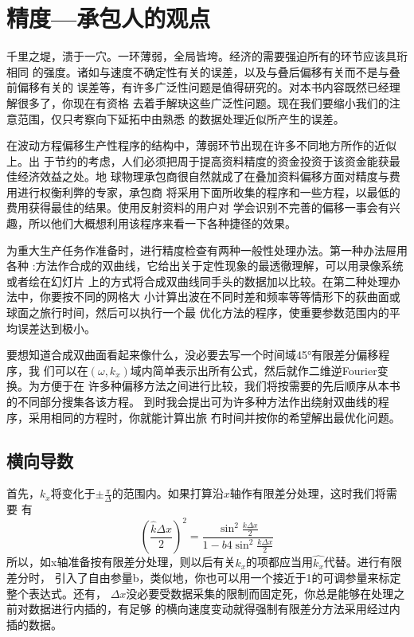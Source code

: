 \section{精度---承包人的观点}
\label{sec:4.7}

千里之堤，溃于一穴。一环薄弱，全局皆垮。经济的需要强迫所有的环节应该具珩相同
的强度。诸如与速度不确定性有关的误差，以及与叠后偏移有关而不是与叠前偏移有关的
误差等，有许多广泛性问题是值得研究的。对本书内容既然已经理解很多了，你现在有资格
去着手解玦这些广泛性问题。现在我们要缩小我们的注意范围，仅只考察向下延拓中由熟悉
的数据处理近似所产生的误差。

在波动方程偏移生产性程序的结构中，薄弱环节出现在许多不同地方所作的近似上。出
于节约的考虑，人们必须把周于提高资料精度的资金投资于该资金能获最佳经济效益之处。地
球物理承包商很自然就成了在叠加资料偏移方面对精度与费用进行权衡利弊的专家，承包商
将采用下面所收集的程序和一些方程，以最低的费用获得最佳的结果。使用反射资料的用户对
学会识别不完善的偏移一事会有兴趣，所以他们大概想利用该程序来看一下各种捷径的效果。

为重大生产任务作准备时，进行精度检查有两种一般性处理办法。第一种办法屉用各种
:方法作合成的双曲线，它给出关于定性现象的最透徹理解，可以用录像系统或者绘在幻灯片
上的方式将合成双曲线同手头的数据加以比较。在第二种处理办法中，你要按不同的网格大
小计算出波在不同时差和频率等等情形下的荻曲面或球面之旅行时间，然后可以执行一个最
优化方法的程序，使重要参数范围内的平均误差达到极小。

要想知道合成双曲面看起来像什么，没必要去写一个时间域45°有限差分偏移程序，我
们可以在$(\omega,k_x)$域内简单表示出所有公式，然后就作二维逆Fourier变换。为方便于在
许多种偏移方法之间进行比较，我们将按需要的先后顺序从本书的不同部分搜集各该方程。
到时我会提出可为许多种方法作出绕射双曲线的程序，采用相同的方程时，你就能计算出旅
冇时间并按你的希望解出最优化问题。

\subsection{横向导数}
\label{sec:4.7.1}

首先，$k_x$将变化于$\pm\frac{\pi}{\Delta}$的范围内。如果打算沿$x$轴作有限差分处理，这时我们将需要
有
\begin{equation}
(\frac{\hat{k}\Delta x}{2})^2=\frac{\sin^2\frac{k\Delta x}{2}}{1-b4\sin^2\frac{k\Delta x}{2}}
\label{eq:ex4.3.7b}
\end{equation}
所以，如x轴准备按有限差分处理，则以后有关$k_x$的项都应当用$\hat{k_x}$代替。进行有限差分时，
引入了自由参量b，类似地，你也可以用一个接近于1的可调参量来标定整个表达式。还有，
$\Delta x$没必要受数据采集的限制而固定死，你总是能够在处理之前对数据进行内插的，有足够
的横向速度变动就得强制有限差分方法采用经过内插的数据。

